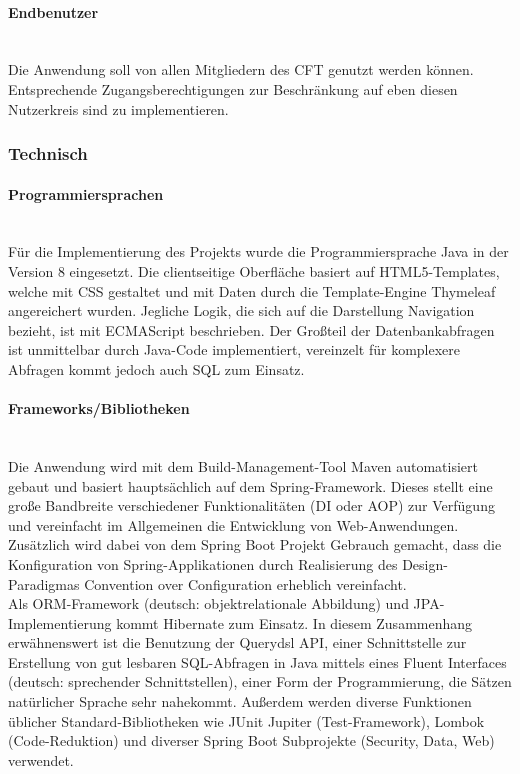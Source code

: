\paragraph{Endbenutzer} ~\\
\label{p:Endbenutzer}
Die Anwendung \projektName soll von allen Mitgliedern des \ac{CFT} \teamName genutzt werden können. Entsprechende Zugangsberechtigungen zur Beschränkung auf eben diesen Nutzerkreis sind zu implementieren.

\subsubsection{Technisch} 
\label{sec:Projektschnittstellen:Technisch}

\paragraph{Programmiersprachen} ~\\
\label{p:Programmiersprachen}
Für die Implementierung des Projekts wurde die Programmiersprache Java in der Version 8 eingesetzt. Die clientseitige Oberfläche basiert auf HTML5-Templates, welche mit CSS gestaltet und mit Daten durch die Template-Engine Thymeleaf angereichert wurden. Jegliche Logik, die sich auf die Darstellung \bzw Navigation bezieht, ist mit ECMAScript beschrieben. Der Großteil der Datenbankabfragen ist unmittelbar durch Java-Code implementiert, vereinzelt für komplexere Abfragen kommt jedoch auch SQL zum Einsatz.

\paragraph{Frameworks/Bibliotheken} ~\\
\label{p:Frameworks}
Die Anwendung wird mit dem Build-Management-Tool Maven automatisiert gebaut und basiert hauptsächlich auf dem Spring-Framework. Dieses stellt eine große Bandbreite verschiedener Funktionalitäten (\zB \ac{DI} oder \ac{AOP}) zur Verfügung und vereinfacht im Allgemeinen die Entwicklung von Web-Anwendungen.\\
Zusätzlich wird dabei von dem Spring Boot Projekt Gebrauch gemacht, dass die Konfiguration von Spring-Applikationen durch Realisierung des Design-Paradigmas Convention over Configuration erheblich vereinfacht.\\
Als \ac{ORM}-Framework (deutsch: objektrelationale Abbildung) und \ac{JPA}-Implementierung kommt Hibernate zum Einsatz. In diesem Zusammenhang erwähnenswert ist die Benutzung der Querydsl API, einer Schnittstelle zur Erstellung von gut lesbaren SQL-Abfragen in Java mittels eines Fluent Interfaces (deutsch: sprechender Schnittstellen), einer Form der Programmierung, die Sätzen natürlicher Sprache sehr nahekommt.
Außerdem werden diverse Funktionen üblicher Standard-Bibliotheken wie JUnit Jupiter (Test-Framework), Lombok (Code-Reduktion) und diverser Spring Boot Subprojekte (Security, Data, Web) verwendet.


